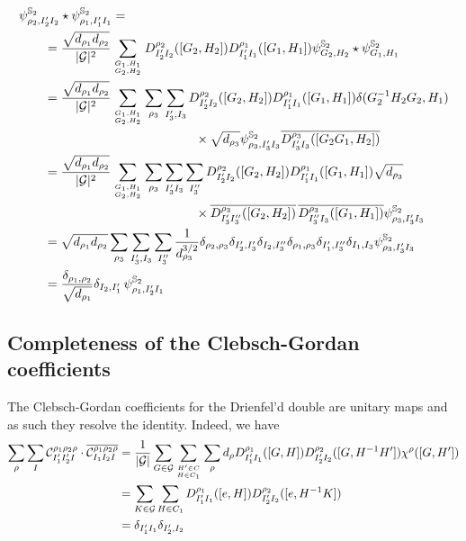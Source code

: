 \documentclass[nofootinbib,superscriptaddress,eqsecnum,tightenlines,11pt]{revtex4-1}
\def\nn{\nonumber}
\def\q{\qquad}
\def\mG{\mathcal{G}}
\renewcommand{\S}{{\mathbb S}}
\begin{document}
\begin{align} \nn
	& \psi^{\S_2}_{\rho_2,I'_2 I_2} \star  \psi^{\S_2}_{\rho_1,I'_1 I_1 } = \\
	&\q = \frac{\sqrt{d_{\rho_1}d_{\rho_2}}}{|\mG|^2}
	\sum_{G_1,H_1 \atop G_2,H_2}
	D^{\rho_2}_{I_2'I_2}([G_2,H_2]) D^{\rho_1}_{I_1'I_1}([G_1,H_1]) \psi^{\S_2}_{G_2,H_2} \star  \psi^{\S_2}_{G_1,H_1}\nn\\
	&\q=\frac{\sqrt{d_{\rho_1}d_{\rho_2}}}{|\mG|^2}
	\sum_{G_1,H_1 \atop G_2,H_2} \sum_{\rho_3}\sum_{I_3',I_3}
	D^{\rho_2}_{I_2'I_2}([G_2,H_2]) D^{\rho_1}_{I_1'I_1}([G_1,H_1]) \delta(G_2^{-1}H_2G_2,H_1) \nn \\
	&\q \q \q \q \q \q \q\times \sqrt{d_{\rho_3}}\psi^{\S_2}_{\rho_3,I_3'I_3}\overline{D^{\rho_3}_{I_3'I_3}([G_2G_1,H_2])}\nn\\
	&\q=\frac{\sqrt{d_{\rho_1}d_{\rho_2}}}{|\mG|^2}
	\sum_{G_1,H_1 \atop G_2,H_2} \sum_{\rho_3}\sum_{I_3'I_3} \sum_{I_3''}
	D^{\rho_2}_{I_2'I_2}([G_2,H_2]) D^{\rho_1}_{I_1'I_1}([G_1,H_1])\sqrt{d_{\rho_3}} \nn \\
	&\q \q \q \q \q \q \q\times \overline{D^{\rho_3}_{I_3'I_3''}([G_2,H_2])} \, \overline{D^{\rho_3}_{I_3''I_3}([G_1,H_1])}
	 \psi^{\S_2}_{\rho_3,I_3'I_3}\nn\\
	&\q=\sqrt{d_{\rho_1}d_{\rho_2}}
	\sum_{\rho_3}\sum_{I_3',I_3} \sum_{I_3''}\frac{1}{d_{\rho_3}^{3/2}}\delta_{\rho_2,\rho_3}\delta_{I_2',I_3'}\delta_{I_2,I_3''}\delta_{\rho_1,\rho_3}\delta_{I_1',I_3''}\delta_{I_1,I_3}
	\psi^{\S_2}_{\rho_3,I_3'I_3}\nn\\
 	&\q= \frac{\delta_{\rho_1,\rho_2}}{\sqrt{d_{\rho_1}}} \delta_{I_2,I_1'} \,  \psi^{\S_2}_{\rho_1,I_2'I_1}
\end{align}
\newpage
\subsection{Completeness of the Clebsch-Gordan coefficients \label{app_complete}}

The Clebsch-Gordan coefficients for the Drienfel'd double are unitary maps and as such they resolve the identity. Indeed, we have 
\begin{align}
	\sum_{\rho}\sum_I
\mathcal{C}^{\rho_1\rho_2\rho}_{I_1'I_2'I} \cdot
\overline{\mathcal{C}^{\rho_1\rho_2\rho}_{I_1I_2I} } &= 
\frac{1}{|\mathcal{G}|}\sum_{G \in \mathcal{G}}\sum_{H' \in C \atop H \in C_1}\sum_{\rho}
	d_{\rho} D^{\rho_1}_{I_1'I_1}([G,H]) D^{\rho_2}_{I_2'I_2}([G,H^{-1}H']) 
	\chi^{\rho}([G,H']) \\
 	&=\sum_{K \in \mathcal{G}}\sum_{H \in C_1}
	D^{\rho_1}_{I_1'I_1}([e,H]) D^{\rho_2}_{I_2'I_2}([e,H^{-1}K]) 
	\\
	&= \delta_{I_1'I_1}\delta_{I_2',I_2} 
\end{align}
\end{document}

